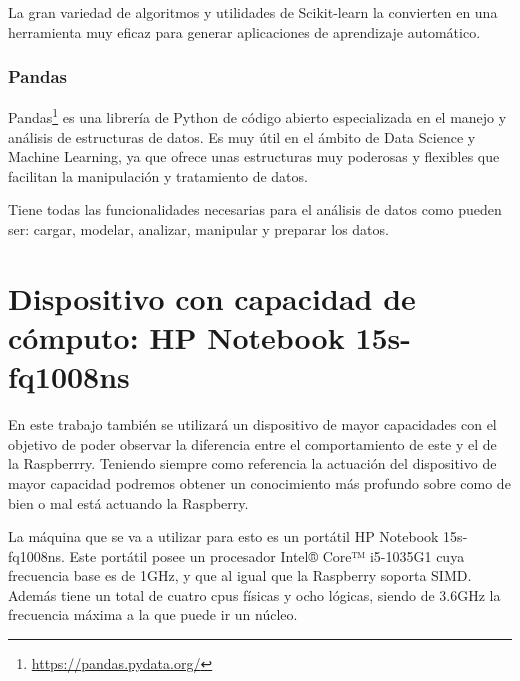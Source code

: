\documentclass[a4paper, 12pt]{book}
\begin{document}
La gran variedad de algoritmos y utilidades de Scikit-learn la convierten en una herramienta muy eficaz para generar aplicaciones de aprendizaje automático.

\subsubsection{Pandas}
\label{subsubsec:Pandas}

Pandas\footnote{\url{https://pandas.pydata.org/}} es una librería de Python de código abierto especializada en el manejo y análisis de estructuras de datos. Es muy útil en el ámbito de Data Science y Machine Learning, ya que ofrece unas estructuras muy poderosas y flexibles que facilitan la manipulación y tratamiento de datos.

Tiene todas las funcionalidades necesarias para el análisis de datos como pueden ser: cargar, modelar, analizar, manipular y preparar los datos.

\section{Dispositivo con capacidad de cómputo: HP Notebook 15s-fq1008ns}
\label{sec:portatil}

En este trabajo también se utilizará un dispositivo de mayor capacidades con el objetivo de poder observar la diferencia entre el comportamiento de este y el de la Raspberrry. Teniendo siempre como referencia la actuación del dispositivo de mayor capacidad podremos obtener un conocimiento más profundo sobre como de bien o mal está actuando la Raspberry. 

La máquina que se va a utilizar para esto es un portátil HP Notebook 15s-fq1008ns. Este portátil posee un procesador Intel® Core™ i5-1035G1 cuya frecuencia base es de 1GHz, y que al igual que la Raspberry soporta SIMD. Además tiene un total de cuatro cpus físicas y ocho lógicas, siendo de 3.6GHz la frecuencia máxima a la que puede ir un núcleo. 
\end{document}

